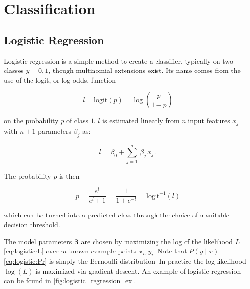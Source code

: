\chapter{Classification}
\label{chap:class}

\section{Logistic Regression}
\label{class:logistic}

Logistic regression is a simple method to create a classifier,
typically on two classes $y = 0,1$, though multinomial extensions exist.
Its name comes from the use of the logit, or log-odds, function

\begin{equation}\label{eq:logistic:logic}
l = \text{logit}\left(p\right) = \log\left(\frac{p}{1-p}\right)
\end{equation}

\noindent on the probability $p$ of class $1$.
$l$ is estimated linearly from $n$ input features $x_{j}$ with $n+1$ parameters $\beta_{j}$ as:

\begin{equation}\label{eq:logistic:logicBeta}
l = \beta_{0} + \sum_{j=1}^{n} \, \beta_{j}\,x_{j}\,.
\end{equation}

\noindent The probability $p$ is then

\begin{equation}\label{eq:logistic:p}
p = \frac{e^l}{e^l + 1} = \frac{1}{1+e^{-l}} = \text{logit}^{-1}\left(l\right)
\end{equation}

\noindent which can be turned into a predicted class through the choice of a suitable decision threshold.

The model parameters $\bm{\beta}$ are chosen by maximizing
the log of the likelihood $L$ \cref{eq:logistic:L} over $m$ known example points $\mathbf{x}_{i}, y_{i}$.
Note that $P\left(y \mid x\right)$ \cref{eq:logistic:Pr} is simply the Bernoulli distribution.
In practice the log-likelihood $\log\left(L\right)$ is maximized via gradient descent.
An example of logistic regression can be found in \cref{fig:logistic_regression_ex}.

